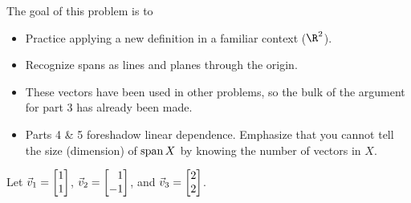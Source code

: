 \documentclass{problemset}
\begin{document}
	\question
	\begin{annotation}
		\begin{goals}

			The goal of this problem is to
			\begin{itemize}
				\item Practice applying a new definition in a familiar context ($\R^2$).
				\item Recognize spans as lines and planes through the origin.
			\end{itemize}
		\end{goals}

		\begin{notes}
			\begin{itemize}
				\item These vectors have been used in other problems,
					so the bulk of the argument for part 3 has
					already been made.
				\item Parts 4 \& 5 foreshadow linear dependence. Emphasize
					that you cannot tell the size (dimension) of $\operatorname{span} X$
					by knowing the number of vectors in $X$.
			\end{itemize}
		\end{notes}
	\end{annotation}
	Let $\vec v_1=\mat{1\\1}$, $\vec v_2=\mat{1\\-1}$, and $\vec v_3=\mat{2\\2}$.
\end{document}
